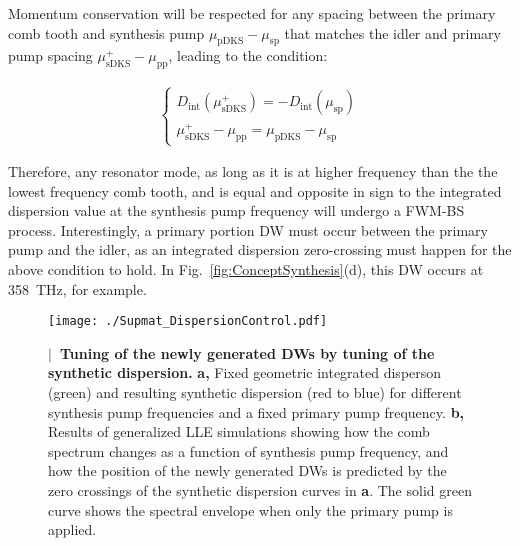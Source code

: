 \documentclass[reprint,superscriptaddress, amsmath,amssymb,pra, aps,floatfix,longbibliography]{revtex4-1}
\begin{document}
Momentum conservation will be respected for any spacing between the primary comb tooth and synthesis pump $\mu_\mathrm{pDKS} - \mu_\mathrm{sp}$ that matches the idler and primary pump spacing $\mu_\mathrm{sDKS}^{+} - \mu_\mathrm{pp} $, leading to the condition:

\begin{align}
    \label{sup-eq:dint-plus-condition}
    \begin{cases}
        D_\mathrm{int}(\mu_\mathrm{sDKS}^{+}) =  -D_\mathrm{int}(\mu_\mathrm{sp}) \\
        \mu_\mathrm{sDKS}^{+} - \mu_\mathrm{pp} = \mu_\mathrm{pDKS} - \mu_\mathrm{sp}
    \end{cases}
\end{align}

Therefore, any resonator mode, as long as it is at higher frequency than the the lowest frequency comb tooth, and is equal and opposite in sign to the integrated dispersion value at the synthesis pump frequency will undergo a FWM-BS process. Interestingly, a primary portion DW must occur between the primary pump and the idler, as an integrated dispersion zero-crossing must happen for the above condition to hold.  In Fig.~\ref{fig:ConceptSynthesis}(d), this DW occurs at 358~THz, for example.

\begin{figure}[!t]
 \begin{center}
  \texttt{[image: ./Supmat\_DispersionControl.pdf]}
 \end{center}
 \caption{\label{fig:Supmat_DispersionControl}\textbf{$|$~Tuning of the newly generated DWs by tuning of the synthetic dispersion.} \textbf{a,} Fixed geometric integrated disperson (green) and resulting synthetic dispersion (red to blue) for different synthesis pump frequencies and a fixed primary pump frequency. \textbf{b,} Results of generalized LLE simulations showing how the comb spectrum changes as a function of synthesis pump frequency, and how the position of the newly generated DWs is predicted by the zero crossings of the synthetic dispersion curves in \textbf{a}. The solid green curve shows the spectral envelope when only the primary pump is applied.}
\end{figure}
\end{document}

